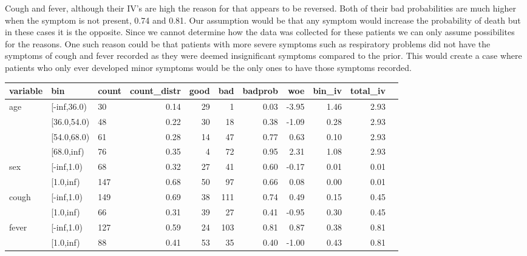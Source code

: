 Cough and fever, although their IV's are high the reason for that appears to be reversed. Both of their bad probabilities are much higher when the symptom is not present, 0.74 and 0.81. Our assumption would be that any symptom would increase the probability of death but in these cases it is the opposite. Since we cannot determine how the data was collected for these patients we can only assume possibilites for the reasons. One such reason could be that patients with more severe symptoms such as respiratory problems did not have the symptoms of cough and fever recorded as they were deemed insignificant symptoms compared to the prior. This would create a case where patients who only ever developed minor symptoms would be the only ones to have those symptoms recorded. \\

\begin{table}[H]
	\centering
	\begin{tabular}{lllrrrrrrrr}
		\toprule
		variable & bin &  count &  count\_distr &  good &  bad &   badprob &       woe &    bin\_iv &  total\_iv \\
		\midrule
		         age &  [-inf,36.0) &     30 &         0.14 &    29 &    1 &     0.03 & -3.95 &    1.46 &      2.93 \\
		      &  [36.0,54.0) &     48 &         0.22 &    30 &   18 &     0.38 & -1.09 &    0.28 &      2.93 \\
		      &  [54.0,68.0) &     61 &         0.28 &    14 &   47 &     0.77 &  0.63 &    0.10 &      2.93 \\
		      &   [68.0,inf) &     76 &         0.35 &     4 &   72 &     0.95 &  2.31 &    1.08 &      2.93 \\
		\midrule
		 sex &  [-inf,1.0) &     68 &         0.32 &    27 &   41 &     0.60 & -0.17 &    0.01 &      0.01 \\
    		  &   [1.0,inf) &    147 &         0.68 &    50 &   97 &     0.66 &  0.08 &    0.00 &      0.01 \\
		\midrule
		  cough &  [-inf,1.0) &    149 &         0.69 &    38 &  111 &     0.74 &  0.49 &    0.15 &      0.45 \\
  		  &   [1.0,inf) &     66 &         0.31 &    39 &   27 &     0.41 & -0.95 &    0.30 &      0.45 \\
		\midrule
		  fever &  [-inf,1.0) &    127 &         0.59 &    24 &  103 &     0.81 &  0.87 &    0.38 &      0.81 \\
  		  &   [1.0,inf) &     88 &         0.41 &    53 &   35 &     0.40 & -1.00 &    0.43 &      0.81 \\

\end{tabular}
\end{table}
